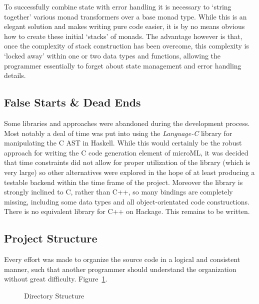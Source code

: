 \documentclass[12pt, a4paper]{report}
\begin{document}
To successfully combine state with error handling it is necessary to `string together' various monad
transformers over a base monad type. While this is an elegant solution and makes writing pure code
easier, it is by no means obvious how to create these initial `stacks' of monads. The advantage
however is that, once the complexity of stack construction has been overcome, this complexity is
`locked away' within one or two data types and functions, allowing the programmer essentially to
forget about state management and error handling details. 

\subsection{False Starts \& Dead Ends}
\label{deadend}
Some libraries and approaches were abandoned during the development process. Most notably a deal of
time was put into using the \textit{Language-C} library for manipulating the C AST in Haskell. While
this would certainly be the robust approach for writing the C code generation element of microML,
it was decided that time constraints did not allow for proper utilization of the library (which is
very large) so other alternatives were explored in the hope of at least producing a testable backend
within the time frame of the project. Moreover the library is strongly inclined to C, rather than
C++, so many bindings are completely missing, including some data types and all object-orientated
code constructions. There is no equivalent library for C++ on Hackage. This remains to be written. 

\subsection{Project Structure}
Every effort was made to organize the source code in a logical and consistent manner, such that
another programmer should understand the organization without great difficulty.
Figure~\ref{fig:dir}.

\begin{figure}
\caption{Directory Structure}
\label{fig:dir}
\end{figure}
\end{document}
